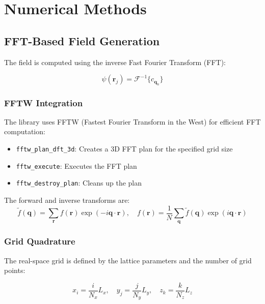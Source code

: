 \chapter{Numerical Methods}

\section{FFT-Based Field Generation}

The field is computed using the inverse Fast Fourier Transform (FFT):

\begin{equation}
    \psi(\boldsymbol{r}_j) = \mathcal{F}^{-1}\{ c_{\boldsymbol{q}_n} \}
\end{equation}

\subsection{FFTW Integration}

The library uses FFTW (Fastest Fourier Transform in the West) for efficient FFT computation:

\begin{itemize}
    \item \texttt{fftw\_plan\_dft\_3d}: Creates a 3D FFT plan for the specified grid size
    \item \texttt{fftw\_execute}: Executes the FFT plan
    \item \texttt{fftw\_destroy\_plan}: Cleans up the plan
\end{itemize}

The forward and inverse transforms are:
\begin{equation}
    \tilde{f}(\boldsymbol{q}) = \sum_{\boldsymbol{r}} f(\boldsymbol{r}) \exp(-i \boldsymbol{q} \cdot \boldsymbol{r}), \quad
    f(\boldsymbol{r}) = \frac{1}{N} \sum_{\boldsymbol{q}} \tilde{f}(\boldsymbol{q}) \exp(i \boldsymbol{q} \cdot \boldsymbol{r})
\end{equation}

\subsection{Grid Quadrature}

The real-space grid is defined by the lattice parameters and the number of grid points:

\begin{equation}
    x_i = \frac{i}{N_x} L_x, \quad y_j = \frac{j}{N_y} L_y, \quad z_k = \frac{k}{N_z} L_z
\end{equation}

